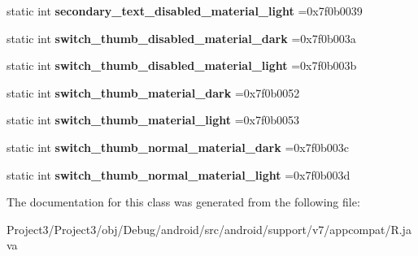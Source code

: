\begin{DoxyCompactItemize}
static int {\bfseries secondary\+\_\+text\+\_\+disabled\+\_\+material\+\_\+light} =0x7f0b0039
\item 
\mbox{\label{classandroid_1_1support_1_1v7_1_1appcompat_1_1R_1_1color_a865950eccb31b1a41071c6a8c6f911cb}} 
static int {\bfseries switch\+\_\+thumb\+\_\+disabled\+\_\+material\+\_\+dark} =0x7f0b003a
\item 
\mbox{\label{classandroid_1_1support_1_1v7_1_1appcompat_1_1R_1_1color_ad6cec4c43935bfa5d21945ac44dce4ce}} 
static int {\bfseries switch\+\_\+thumb\+\_\+disabled\+\_\+material\+\_\+light} =0x7f0b003b
\item 
\mbox{\label{classandroid_1_1support_1_1v7_1_1appcompat_1_1R_1_1color_a83828ef5ef4268d42a4df6bbf902abdb}} 
static int {\bfseries switch\+\_\+thumb\+\_\+material\+\_\+dark} =0x7f0b0052
\item 
\mbox{\label{classandroid_1_1support_1_1v7_1_1appcompat_1_1R_1_1color_a0cda581f161653de3acaa259ce78b6ab}} 
static int {\bfseries switch\+\_\+thumb\+\_\+material\+\_\+light} =0x7f0b0053
\item 
\mbox{\label{classandroid_1_1support_1_1v7_1_1appcompat_1_1R_1_1color_a145f0d5877c3e2755d2f2b3dcbb0d4ef}} 
static int {\bfseries switch\+\_\+thumb\+\_\+normal\+\_\+material\+\_\+dark} =0x7f0b003c
\item 
\mbox{\label{classandroid_1_1support_1_1v7_1_1appcompat_1_1R_1_1color_a8e984610daa693734b78fed669fb4b3a}} 
static int {\bfseries switch\+\_\+thumb\+\_\+normal\+\_\+material\+\_\+light} =0x7f0b003d
\end{DoxyCompactItemize}


The documentation for this class was generated from the following file\+:\begin{DoxyCompactItemize}
\item 
Project3/\+Project3/obj/\+Debug/android/src/android/support/v7/appcompat/R.\+java\end{DoxyCompactItemize}
